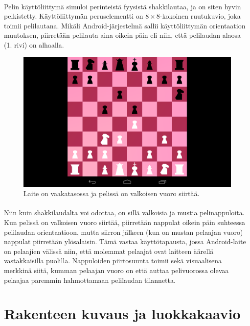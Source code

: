 \documentclass[11pt]{article}
\begin{document}
\paragraph{} Pelin käyttöliittymä simuloi perinteistä fyysistä shakkilautaa, ja on siten hyvin pelkistetty. Käyttöliittymän peruselementti on $8\times8$-kokoinen ruutukuvio, joka toimii pelilautana. Mikäli Android-järjestelmä sallii käyttöliittymän orientaation muutoksen, piirretään pelilauta aina oikein päin eli niin, että pelilaudan alaosa (1. rivi) on alhaalla.

\begin{figure}
\includegraphics[width=\linewidth]{vaakakali.png}
\caption{Laite on vaakatasossa ja pelissä on valkoisen vuoro siirtää.}
\label{fig:kali}
\end{figure}

\paragraph{} Niin kuin shakkilaudalta voi odottaa, on sillä valkoisia ja mustia pelinappuloita. Kun pelissä on valkoisen vuoro siirtää, piirretään nappulat oikein päin suhteessa pelilaudan orientaatioon, mutta siirron jälkeen (kun on mustan pelaajan vuoro) nappulat piirretään ylösalaisin. Tämä vastaa käyttötapausta, jossa Android-laite on pelaajien välissä niin, että molemmat pelaajat ovat laitteen äärellä vastakkaisilla puolilla. Nappuloiden piirtosuunta toimii sekä visuaalisena merkkinä siitä, kumman pelaajan vuoro on että auttaa pelivuorossa olevaa pelaajaa paremmin hahmottamaan pelilaudan tilannetta.

\section{Rakenteen kuvaus ja luokkakaavio}
\end{document}
